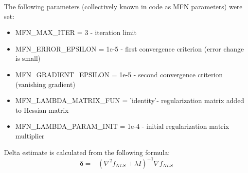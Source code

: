 The following parameters (collectively known in code as MFN parameters) were set:
\begin{itemize}
	\item 
	MFN\_MAX\_ITER = 3 - iteration limit
	
	\item
	MFN\_ERROR\_EPSILON = 1e-5 - first convergence criterion (error change is small)
	
	\item
	MFN\_GRADIENT\_EPSILON = 1e-5 - second convergence criterion (vanishing gradient)
	
	\item
	MFN\_LAMBDA\_MATRIX\_FUN = 'identity'- regularization matrix added to Hessian matrix
	
	\item 
	MFN\_LAMBDA\_PARAM\_INIT = 1e-4 - initial regularization matrix multiplier
\end{itemize}

Delta estimate is calculated from the following formula:
\begin{equation}
\boldsymbol{\delta}=-\left(\nabla^2{f_{NLS}+\lambda I}\right)^{-1}\nabla{f_{NLS}}
\label{Eq:m6_impl_3}
\end{equation}
